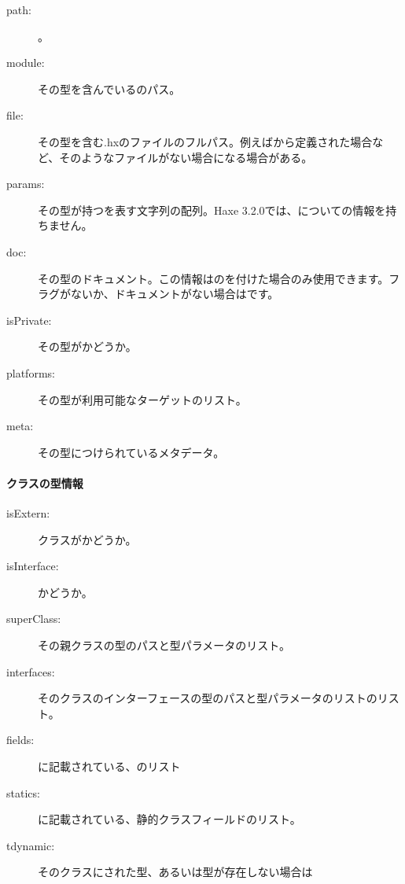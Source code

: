 \begin{description}
	\item[path:] 。
	\item[module:] その型を含んでいるのパス。
	\item[file:] その型を含む.hxのファイルのフルパス。例えばから定義された場合など、そのようなファイルがない場合になる場合がある。
	\item[params:] その型が持つを表す文字列の配列。Haxe 3.2.0では、についての情報を持ちません。
	\item[doc:] その型のドキュメント。この情報はのを付けた場合のみ使用できます。フラグがないか、ドキュメントがない場合はです。
	\item[isPrivate:] その型がかどうか。
	\item[platforms:] その型が利用可能なターゲットのリスト。
	\item[meta:] その型につけられているメタデータ。
\end{description}
	
\paragraph{クラスの型情報}
\label{cr-rtti-class-type-information}

\begin{description}
	\item[isExtern:] クラスがかどうか。
	\item[isInterface:] かどうか。
	\item[superClass:] その親クラスの型のパスと型パラメータのリスト。
	\item[interfaces:] そのクラスのインターフェースの型のパスと型パラメータのリストのリスト。
	\item[fields:] に記載されている、のリスト
	\item[statics:] に記載されている、静的クラスフィールドのリスト。
	\item[tdynamic:] そのクラスにされた型、あるいは型が存在しない場合は
\end{description}

